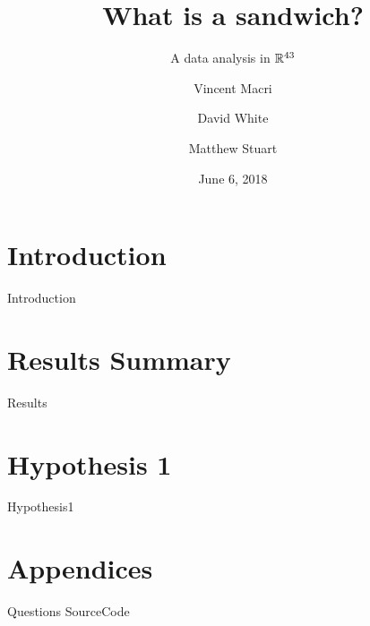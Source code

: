 

\title{What is a sandwich?}
\subtitle{A data analysis in $\mathbb{R}^{43}$}
\author{Vincent Macri \and David White \and Matthew Stuart}
\date{June 6, 2018}


	\maketitle
	
	\tableofcontents
	\clearpage
	\part{Introduction}\label{part:introduction}
		{Introduction}
	\part{Results Summary}\label{part:results}
		{Results}
	\part{Hypothesis 1}\label{part:hypothesis1}
		{Hypothesis1}
	\appendix
	\part{Appendices}\label{part:appendix}
		{Questions}
		{SourceCode}
	\nocite{*}
	\printbibliography

